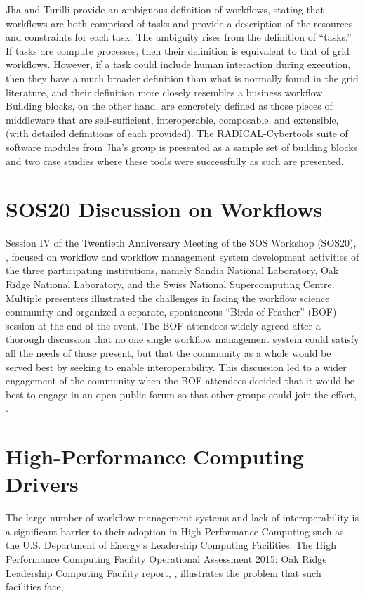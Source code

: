 Jha and Turilli provide an ambiguous definition of workflows, stating
that workflows are both comprised of tasks and provide a description of
the resources and constraints for each task. The ambiguity rises from
the definition of ``tasks.'' If tasks are compute processes, then their
definition is equivalent to that of grid workflows. However, if a task
could include human interaction during execution, then they have a much
broader definition than what is normally found in the grid literature,
and their definition more closely resembles a business workflow.
Building blocks, on the other hand, are concretely defined as those
pieces of middleware that are self-sufficient, interoperable,
composable, and extensible, (with detailed definitions of each
provided). The RADICAL-Cybertools suite of software modules from Jha's
group is presented as a sample set of building blocks and two case
studies where these tools were successfully as such are presented.

\section{SOS20 Discussion on
Workflows}\label{sos20-discussion-on-workflows}

Session IV of the Twentieth Anniversary Meeting of the SOS Workshop
(SOS20), \cite{pack_sos20_2016}, focused on workflow and workflow management
system development activities of the three participating institutions,
namely Sandia National Laboratory, Oak Ridge National Laboratory, and
the Swiss National Supercomputing Centre. Multiple presenters
illustrated the challenges in facing the workflow science community and
organized a separate, spontaneous ``Birds of Feather'' (BOF) session at
the end of the event. The BOF attendees widely agreed after a thorough
discussion that no one single workflow management system could satisfy
all the needs of those present, but that the community as a whole would
be served best by seeking to enable interoperability. This discussion
led to a wider engagement of the community when the BOF attendees
decided that it would be best to engage in an open public forum so that
other groups could join the effort, \cite{billings_[science-iwg]_2016}.

\section{High-Performance Computing
Drivers}\label{high-performance-computing-drivers}

The large number of workflow management systems and lack of
interoperability is a significant barrier to their adoption in
High-Performance Computing such as the U.S. Department of Energy's
Leadership Computing Facilities. The High Performance Computing Facility
Operational Assessment 2015: Oak Ridge Leadership Computing Facility
report, \cite{barker_scientific_2007}, illustrates the problem that such facilities
face,

